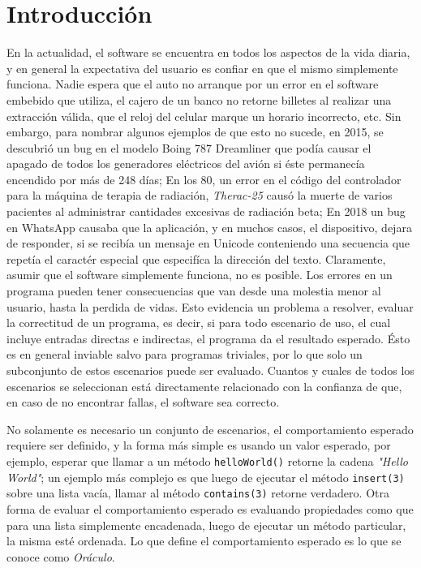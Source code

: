 \chapter{Introducci\'on}
\label{cap:introduccion}
En la actualidad, el software se encuentra en todos los aspectos de la vida diaria, y en general la expectativa del usuario es confiar en que el mismo simplemente funciona. Nadie espera que el auto no arranque por un error en el software embebido que utiliza, el cajero de un banco no retorne billetes al realizar una extracci\'on v\'alida, que el reloj del celular marque un horario incorrecto, etc. Sin embargo, para nombrar algunos ejemplos de que esto no sucede, en 2015, se descubri\'o un bug en el modelo Boing 787 Dreamliner que pod\'ia causar el apagado de todos los generadores el\'ectricos del avi\'on si \'este permanec\'ia encendido por m\'as de 248 d\'ias; En los 80, un error en el c\'odigo del controlador para la m\'aquina de terapia de radiaci\'on, \emph{Therac-25} caus\'o la muerte de varios pacientes al administrar cantidades excesivas de radiaci\'on beta; En 2018 un bug en WhatsApp causaba que la aplicaci\'on, y en muchos casos, el dispositivo, dejara de responder, si se recib\'ia un mensaje en Unicode conteniendo una secuencia que repet\'ia el caract\'er especial que especif\'ica la direcci\'on del texto.
Claramente, asumir que el software simplemente funciona, no es posible. Los errores en un programa pueden tener consecuencias que van desde una molestia menor al usuario, hasta la perdida de vidas. Esto evidencia un problema a resolver, evaluar la correctitud de un programa, es decir, si para todo escenario de uso, el cual incluye entradas directas e indirectas, el programa da el resultado esperado. \'Esto es en general inviable salvo para programas triviales, por lo que solo un subconjunto de estos escenarios puede ser evaluado. Cuantos y cuales de todos los escenarios se seleccionan est\'a directamente relacionado con la confianza de que, en caso de no encontrar fallas, el software sea correcto.

No solamente es necesario un conjunto de escenarios, el comportamiento esperado requiere ser definido, y la forma m\'as simple es usando un valor esperado, por ejemplo, esperar que llamar a un m\'etodo \texttt{helloWorld()} retorne la cadena \emph{"Hello World"}; un ejemplo m\'as complejo es que luego de ejecutar el m\'etodo \texttt{insert(3)} sobre una lista vac\'ia, llamar al m\'etodo \texttt{contains(3)} retorne verdadero. Otra forma de evaluar el comportamiento esperado es evaluando propiedades como que para una lista simplemente encadenada, luego de ejecutar un m\'etodo particular, la misma est\'e ordenada. Lo que define el comportamiento esperado es lo que se conoce como \emph{Or\'aculo}.

